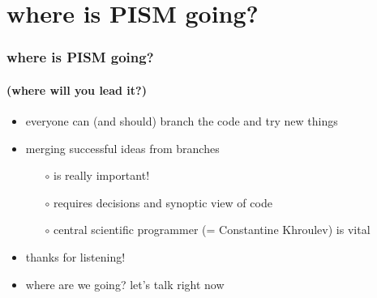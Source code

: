 \documentclass[hide notes,intlimits]{beamer}
\begin{document}
\section[where to?]{where is PISM going?}

\begin{frame}
  \frametitle{where is PISM going?}
  \framesubtitle{(where will you lead it?)}

\begin{itemize}
  \item everyone can (and should) branch the code and try new things
  \item merging successful ideas from branches
    \begin{itemize}
    \item[$\circ$] is really important!
    \item[$\circ$] requires decisions and synoptic view of code
    \item[$\circ$] central scientific programmer (= Constantine Khroulev) is vital
    \end{itemize}
  \item \alert{thanks for listening!}

\bigskip\bigskip

  \item where are we going?  let's talk right now
\end{itemize}

\end{frame}
\end{document}
